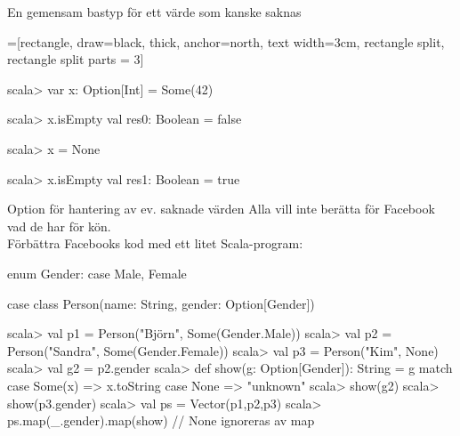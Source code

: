 \begin{Slide}{En gemensam bastyp för ett värde som kanske saknas}\SlideFontSmall\ifkompendium\footnotesize\fi
\vspace{-0.0em}\begin{center}
\newcommand{\TextBox}[1]{\raisebox{0pt}[1em][0.5em]{#1}}
=[rectangle, draw=black,  thick, anchor=north, text width=3cm, rectangle split, rectangle split parts = 3]
\end{center}
\pause
\vspace{-0.5em}\begin{REPL}
scala> var x: Option[Int] = Some(42)

scala> x.isEmpty
val res0: Boolean = false

scala> x = None

scala> x.isEmpty
val res1: Boolean = true
\end{REPL}
\end{Slide}


\begin{Slide}{Option för hantering av ev. saknade värden}\SlideFontSmall
Alla vill inte berätta för Facebook vad de har för kön. \\ Förbättra Facebooks kod med ett litet Scala-program:
\begin{Code}
enum Gender:
  case Male, Female

case class Person(name: String, gender: Option[Gender])
\end{Code}
\pause
\begin{REPL}
scala> val p1 = Person("Björn",  Some(Gender.Male))
scala> val p2 = Person("Sandra", Some(Gender.Female))
scala> val p3 = Person("Kim",  None)
scala> val g2 = p2.gender
scala> def show(g: Option[Gender]): String = g match {
         case Some(x) => x.toString
         case None    => "unknown"
       }
scala> show(g2)
scala> show(p3.gender)
scala> val ps = Vector(p1,p2,p3)
scala> ps.map(_.gender).map(show)   // None ignoreras av map
\end{REPL}
\end{Slide}

